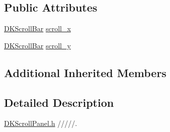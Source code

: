 \subsection*{Public Attributes}
\begin{DoxyCompactItemize}
\item 
\hyperlink{class_d_k_scroll_bar}{D\-K\-Scroll\-Bar} \hyperlink{class_d_k_scroll_panel_a88e154d420d31a934568836dc4efdf33}{scroll\-\_\-x}
\item 
\hyperlink{class_d_k_scroll_bar}{D\-K\-Scroll\-Bar} \hyperlink{class_d_k_scroll_panel_a0cee174b877c442a44f6c3a1896b525a}{scroll\-\_\-y}
\end{DoxyCompactItemize}
\subsection*{Additional Inherited Members}


\subsection{Detailed Description}
\hyperlink{_d_k_scroll_panel_8h}{D\-K\-Scroll\-Panel.\-h} /////. 

